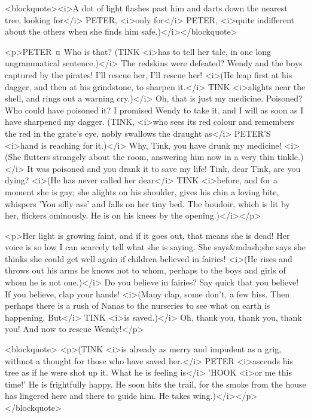 <blockquote><i>A dot of light flashes past him and darts down the nearest tree, looking for</i> PETER, <i>only for</i> PETER, <i>quite indifferent about the others when she finds him safe.)</i></blockquote>

<p>PETER ¤
Who is that? (TINK <i>has to tell her tale, in one long ungrammatical sentence.)</i> The redskins were defeated? Wendy and the boys captured by the pirates! I'll rescue her, I'll rescue her! <i>(He leap first at his dagger, and then at his grindstone, to sharpen it.</i> TINK <i>alights near the shell, and rings out a warning cry.)</i> Oh, that is just my medicine. Poisoned? Who could have poisoned it? I promised Wendy to take it, and I will as soon as I have sharpened my dagger. (TINK, <i>who sees its red colour and remembers the red in the grate's eye, nobly swallows the draught as</i> PETER'S <i>hand is reaching for it.)</i> Why, Tink, you have drunk my medicine! <i>(She flutters strangely about the room, answering him now in a very thin tinkle.)</i> It was poisoned and you drank it to save my life! Tink, dear Tink, are you dying? <i>(He has never called her dear</i> TINK <i>before, and for a moment she is gay; she alights on his shoulder, gives his chin a loving bite, whispers 'You silly ass' and falls on her tiny bed. The boudoir, which is lit by her, flickers ominously. He is on his knees by the opening.)</i></p>

<p>Her light is growing faint, and if it goes out, that means she is dead! Her voice is so low I can scarcely tell what she is saying. She says&mdash;she says she thinks she could get well again if children believed in fairies! <i>(He rises and throws out his arms he knows not to whom, perhaps to the boys and girls of whom he is not one.)</i> Do you believe in fairies? Say quick that you believe! If you believe, clap your hands! <i>(Many clap, some don't, a few hiss. Then perhaps there is a rush of Nanas to the nurseries to see what on earth is happening. But</i> TINK <i>is saved.)</i> Oh, thank you, thank you, thank you! And now to rescue Wendy!</p>

<blockquote> <p>(TINK <i>is already as merry and impudent as a grig, withnot a thought for those who have saved her.</i> PETER <i>ascends his tree as if he were shot up it. What he is feeling is</i> 'HOOK <i>or me this time!' He is frightfully happy. He soon hits the trail, for the smoke from the house has lingered here and there to guide him. He takes wing.)</i></p> </blockquote>
